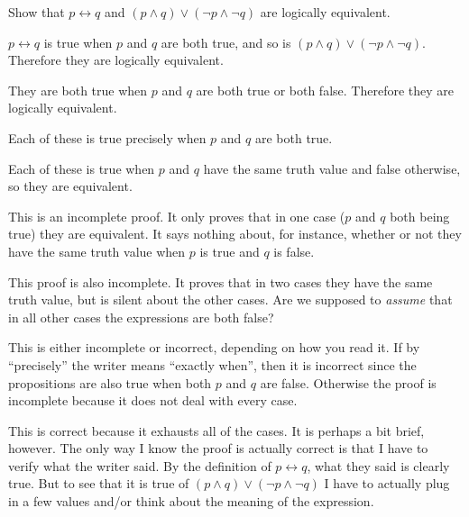 \begin{eval}
Show that $p\leftrightarrow q$ and $(p\wedge q)\vee(\neg p\wedge \neg q)$ are logically equivalent.
\begin{spfenum}
\item
$p\leftrightarrow q$ is true when $p$ and $q$ are both true, and so is $(p\wedge q)\vee(\neg p\wedge \neg q)$.
Therefore they are logically equivalent.

\evallinethree
\item
They are both true when $p$ and $q$ are both true or both false.  Therefore they are logically equivalent.

\evallinethree
\item
Each of these is true precisely when $p$ and $q$ are both true.

\evallinethree
\item
Each of these is true when $p$ and $q$ have the same truth value and false otherwise, so they are
equivalent.

\evallinethree
\end{spfenum}
\begin{answer}
\begin{pfevalenum}
\item
This is an incomplete proof.  It only proves that in one case ($p$ and $q$ both being true) they are
equivalent.  It says nothing about, for instance, whether or not they have the same truth value
when $p$ is true and $q$ is false.
\item
This proof is also incomplete.  It proves that in two cases they have the same truth value, but is silent
about the other cases.  Are we supposed to {\em assume} that in all other cases the expressions are both false?
\item
This is either incomplete or incorrect, depending on how you read it.  
If by ``precisely'' the writer means ``exactly when'', then it is incorrect since the propositions are
also true when both $p$ and $q$ are false.  Otherwise the proof is incomplete because it does not deal
with every case.
\item
This is correct because it exhausts all of the cases.  It is perhaps a bit brief, however.  
The only way I know the proof is actually correct is that I have to verify what the writer said.
By the definition of $p\leftrightarrow q$, what they said is clearly true.  But to see that it is true of
$(p\wedge q)\vee(\neg p\wedge \neg q)$ I have to actually plug in a few values and/or think about the
meaning of the expression.  
\end{pfevalenum}
\end{answer}
\end{eval}

